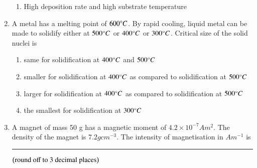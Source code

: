 \documentclass[journal]{IEEEtran}
\numberwithin{equation}{enumi}
\numberwithin{figure}{enumi}
\begin{document}
\begin{enumerate}
\begin{enumerate}
                        \item High deposition rate and high substrate temperature
                \end{enumerate}
	\item A metal has a melting point of $600\degree C$. By rapid cooling, liquid metal can be made to solidify either at $500\degree C$ or $400\degree C$ or $300\degree C$. Critical size of the solid nuclei is
		\begin{enumerate}                                                               
                        \item same for solidification at $400\degree C$ and $500\degree C$
			\item smaller for solidification at $400\degree C$ as compared to solidification at $500\degree C$
                        \item larger for solidification at $400\degree C$ as compared to solidification at $500\degree C$
                        \item the smallest for solidification at $300\degree C$
                \end{enumerate}
	\item A magnet of mass 50 g has a magnetic moment of $4.2 \times 10^{-7} A m^2$. The density of the magnet is $7.2 g cm^{-3}$. The intensity of magnetisation in $A m^{-1}$ is \rule{1cm}{0.4pt} $\left(\text{round off to 3 decimal places}\right)$
\end{enumerate}
\end{document}
